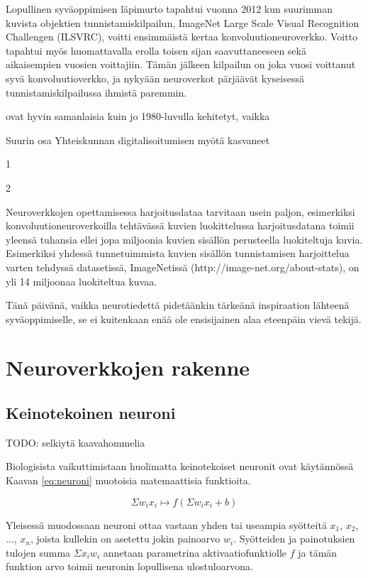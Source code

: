 \documentclass[finnish]{tktltiki2}
\theoremstyle{definition}
\theoremstyle{remark}
\begin{document}
  Lopullinen syväoppimisen läpimurto tapahtui vuonna 2012 kun suurimman kuvista objektien tunnistamiskilpailun, ImageNet Large Scale Visual Recognition Challengen (ILSVRC), voitti ensimmäistä kertaa konvoluutioneuroverkko. Voitto tapahtui myös huomattavalla erolla toisen sijan saavuttaneeseen sekä aikaisempien vuosien voittajiin. Tämän jälkeen kilpailun on joka vuosi voittanut syvä konvoluutioverkko, ja nykyään neuroverkot pärjäävät kyseisessä tunnistamiskilpailussa ihmistä paremmin.

  ovat hyvin samanlaisia kuin jo 1980-luvulla kehitetyt, vaikka 

  Suurin osa Yhteiskunnan digitalisoitumisen myötä kasvaneet 

  1
  
  2

  Neuroverkkojen opettamisessa harjoitusdataa tarvitaan usein paljon, esimerkiksi konvoluutioneuroverkoilla tehtävässä kuvien luokittelussa harjoitusdatana toimii yleensä tuhansia ellei jopa miljoonia kuvien sisällön perusteella luokiteltuja kuvia. Esimerkiksi yhdessä tunnetuimmista kuvien sisällön tunnistamisen harjoittelua varten tehdyssä datasetissä, ImageNetissä (http://image-net.org/about-stats), on yli 14 miljoonaa luokiteltua kuvaa.

  Tänä päivänä, vaikka neurotiedettä pidetäänkin tärkeänä inspiraation lähteenä syväoppimiselle, se ei kuitenkaan enää ole ensisijainen alaa eteenpäin vievä tekijä.

  \section{Neuroverkkojen rakenne}
  \subsection{Keinotekoinen neuroni}

    TODO: selkiytä kaavahommelia

    Biologisista vaikuttimistaan huolimatta keinotekoiset neuronit ovat käytännössä Kaavan \ref{eq:neuroni} muotoisia matemaattisia funktioita.

    \begin{equation}
      \label{eq:neuroni}
      \Sigma w_i x_i \mapsto f(\Sigma w_i x_i + b)
    \end{equation}

    Yleisessä muodossaan neuroni ottaa vastaan yhden tai useampia syötteitä $x_1$, $x_2$, ..., $x_n$, joista kullekin on asetettu jokin painoarvo $w_i$. Syötteiden ja painotuksien tulojen summa $\Sigma x_i w_i$ annetaan parametrina aktivaatiofunktiolle $f$ ja tämän funktion arvo toimii neuronin lopullisena ulostuloarvona.
\end{document}
